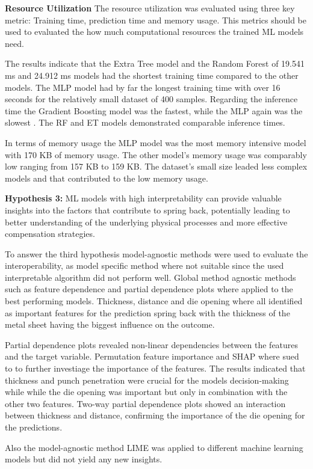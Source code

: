 \textbf{Resource Utilization}
The resource utilization was evaluated using three key metric: Training time, prediction time and memory usage.
This metrics should be used to evaluated the how much computational resources the trained \ac{ML} models need.

The results indicate that the Extra Tree model and the Random Forest of 19.541 ms and 24.912 ms models had the shortest
training time compared to the other models.
The MLP model had by far the longest training time with over 16 seconds for the relatively small dataset of 400 samples.
Regarding the inference time the Gradient Boosting model was the fastest, while the MLP again was the slowest .
The RF and ET models demonstrated comparable inference times.

In terms of memory usage the MLP model was the most memory intensive model with 170 KB of memory usage.
The other model's memory usage was comparably low ranging from 157 KB to 159 KB.
The dataset's small size leaded less complex models and that contributed to the low memory usage.

\textbf{Hypothesis 3:} ML models with high interpretability can provide valuable insights into the factors that
contribute to spring back, potentially leading to better understanding of the underlying physical processes and
more effective compensation strategies.

To answer the third hypothesis model-agnostic methods were used to evaluate the interoperability, as model specific
method where not suitable since the used interpretable algorithm did not perform well.
Global method agnostic methods such as feature dependence and partial dependence plots where applied to the best
performing models.
Thickness, distance and die opening where all identified as important features for the prediction spring back with the
thickness of the metal sheet having the biggest influence on the outcome.

Partial dependence plots revealed non-linear dependencies between the features and the target variable.
Permutation feature importance and SHAP where sued to to further investiage the importance of the features.
The results indicated that thickness and punch penetration were crucial for the models decision-making while while the
die opening was important but only in combination with the other two features.
Two-way partial dependence plots showed an interaction between thickness and distance, confirming the importance of the
die opening for the predictions.

Also the model-agnostic method LIME was applied to different machine learning models but did not yield any new insights.

